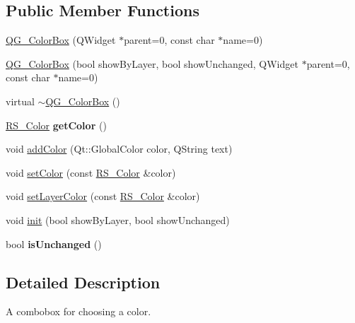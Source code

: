 \subsection*{Public Member Functions}
\begin{DoxyCompactItemize}
\item 
\hyperlink{classQG__ColorBox_a88451f744118b8ba7b90b1963e9e2584}{Q\-G\-\_\-\-Color\-Box} (Q\-Widget $\ast$parent=0, const char $\ast$name=0)
\item 
\hyperlink{classQG__ColorBox_a36e04f1a12a0f7b44b8e588aaa61169f}{Q\-G\-\_\-\-Color\-Box} (bool show\-By\-Layer, bool show\-Unchanged, Q\-Widget $\ast$parent=0, const char $\ast$name=0)
\item 
virtual \hyperlink{classQG__ColorBox_a3fbfcb4b7c9a384db5268a3759f5d185}{$\sim$\-Q\-G\-\_\-\-Color\-Box} ()
\item 
\hypertarget{classQG__ColorBox_a52e0fa11d686f0cb04ff8d9af269cb1e}{\hyperlink{classRS__Color}{R\-S\-\_\-\-Color} {\bfseries get\-Color} ()}\label{classQG__ColorBox_a52e0fa11d686f0cb04ff8d9af269cb1e}

\item 
void \hyperlink{classQG__ColorBox_a75e7ac16011ef2188ad6140674c7e638}{add\-Color} (Qt\-::\-Global\-Color color, Q\-String text)
\item 
void \hyperlink{classQG__ColorBox_a304b0cb1ede5388f940fdaa753f8e721}{set\-Color} (const \hyperlink{classRS__Color}{R\-S\-\_\-\-Color} \&color)
\item 
void \hyperlink{classQG__ColorBox_a98581a273be62c532652cdf75bd81674}{set\-Layer\-Color} (const \hyperlink{classRS__Color}{R\-S\-\_\-\-Color} \&color)
\item 
void \hyperlink{classQG__ColorBox_a3ec3ec7a178bf840b29156015978eb19}{init} (bool show\-By\-Layer, bool show\-Unchanged)
\item 
\hypertarget{classQG__ColorBox_ae736f16eaa045243c3e9ef2888406504}{bool {\bfseries is\-Unchanged} ()}\label{classQG__ColorBox_ae736f16eaa045243c3e9ef2888406504}

\end{DoxyCompactItemize}


\subsection{Detailed Description}
A combobox for choosing a color. 

